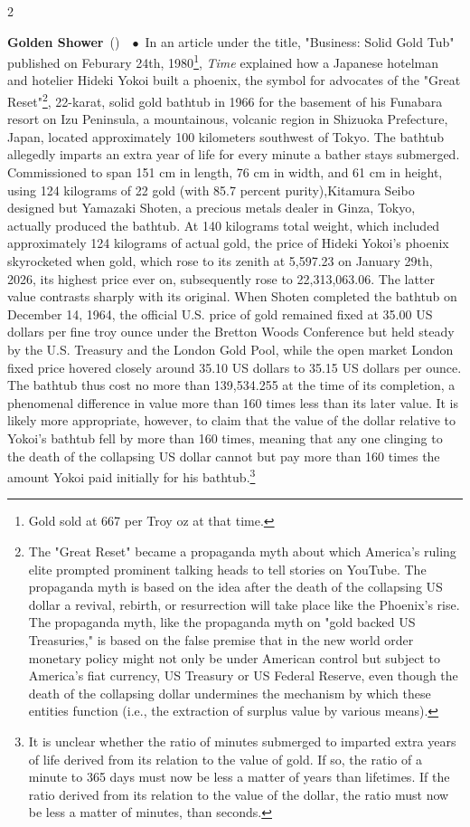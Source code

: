 \documentclass[10pt,a4paper,twoside]{article} %
\newcommand{\entry}[4]{\markboth{#1}{#1}\textbf{#1}\ {(#2)}\ \textit{#3}\ $\bullet$\ {#4}}  %
\begin{document}
\begin{multicols}{2}
\entry{Golden Shower} {} {} {In an article under the title, "Business: Solid Gold Tub" published on Feburary 24th, 1980\footnote{Gold sold at 667 per Troy oz at that time.}, \emph{Time} explained how a Japanese hotelman and hotelier Hideki Yokoi built a phoenix,  the symbol for advocates of the "Great Reset"\footnote{The "Great Reset" became a propaganda myth about which America's ruling elite prompted prominent talking heads to tell stories on YouTube. The propaganda myth is based on the idea after the death of the collapsing US dollar a revival, rebirth, or resurrection will take place like the Phoenix's rise. The propaganda myth, like the propaganda myth on "gold backed US Treasuries," is based on the false premise that in the new world order monetary policy might not only be under American control but subject to America's fiat currency, US Treasury or US Federal Reserve, even though the death of the collapsing dollar undermines the mechanism by which these entities function (i.e., the extraction of surplus value by various means).}, 22-karat, solid gold bathtub in 1966 for the basement of his Funabara resort on Izu Peninsula, a mountainous, volcanic region in Shizuoka Prefecture, Japan, located approximately 100 kilometers southwest of Tokyo. The bathtub allegedly imparts an extra year of life for every minute a bather stays submerged. 
\newline \indent Commissioned to span 151 cm in length, 76 cm in width, and 61 cm in height, using 124 kilograms of 22 gold (with 85.7 percent purity),Kitamura Seibo designed but Yamazaki Shoten, a precious metals dealer in Ginza, Tokyo, actually produced the bathtub. At 140 kilograms total weight, which included approximately 124 kilograms of actual gold, the price of Hideki Yokoi's phoenix skyrocketed when gold, which rose to its zenith at 5,597.23  on January 29th, 2026, its highest price ever on, subsequently rose to 22,313,063.06. The latter value contrasts sharply with its original. When Shoten completed the bathtub on December 14, 1964, the official U.S. price of gold remained fixed at 35.00 US dollars per fine troy ounce under the Bretton Woods Conference but held steady by the U.S. Treasury and the London Gold Pool, while the open market London fixed price hovered closely around 35.10 US dollars to 35.15 US dollars per ounce. The bathtub thus cost no more than 139,534.255 at the time of its completion, a phenomenal difference in value more than 160 times less than its later value. It is likely more appropriate, however, to claim that the value of the dollar relative to Yokoi's bathtub fell by more than 160 times, meaning that any one clinging to the death of the collapsing US dollar cannot but pay more than 160 times the amount Yokoi paid initially for his bathtub.\footnote{It is unclear whether the ratio of minutes submerged to imparted extra years of life derived from its relation to the value of gold. If so, the ratio of a minute to 365 days must now be less a matter of years than lifetimes. If the ratio derived from its relation to the value of the dollar, the ratio must now be less a matter of minutes, than seconds.}
}


\end{multicols}
\end{document}
